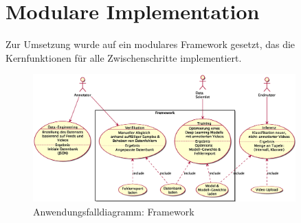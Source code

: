 


\section{Modulare Implementation}
\label{sec:konzeptuelle-umsetzung}

Zur Umsetzung wurde auf ein modulares Framework gesetzt, das die Kernfunktionen für alle Zwischenschritte implementiert.

\begin{figure}[htbp!]
    \centering
    \includegraphics[width=0.9\textwidth, height=0.8\textwidth, keepaspectratio, interpolate]{fig/usecase.eps}
    \caption{Anwendungsfalldiagramm: Framework}
    \label{fig:usecase}
\end{figure}

